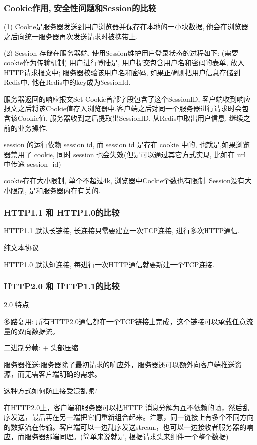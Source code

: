 \subsubsection{Cookie作用, 安全性问题和Session的比较}
(1) Cookie是服务器发送到用户浏览器并保存在本地的一小块数据,  他会在浏览器之后向统一服务器再次发送请求时被携带上.
\par
(2) Session 存储在服务器端. 使用Session维护用户登录状态的过程如下: (需要cookie作为传输机制)
用户进行登陆是, 用户提交包含用户名和密码的表单, 放入HTTP请求报文中;
服务器校验该用户名和密码, 如果正确则把用户信息存储到Redis中, 他在Redis中的key成为SessionId.
\par
服务器返回的响应报文Set-Cookie首部字段包含了这个SessionID, 客户端收到响应报文之后将该Cookie值存入浏览器中.客户端之后对同一个服务器进行请求时会包含该Cookie值, 服务器收到之后提取出SessionID, 从Redis中取出用户信息, 继续之前的业务操作.
\par
session 的运行依赖 session id, 而 session id 是存在 cookie 中的, 也就是,如果浏览器禁用了 cookie, 同时 session 也会失效(但是可以通过其它方式实现, 比如在 url 中传递 session\_id)
\par
cookie存在大小限制, 单个不超过4k, 浏览器中Cookie个数也有限制.
Session没有大小限制, 是和服务器内存有关的.
\subsubsection{HTTP1.1 和 HTTP1.0的比较}
HTTP1.1 默认长链接, 长连接只需要建立一次TCP连接, 进行多次HTTP通信.

纯文本协议


HTTP1.0 默认短连接, 每进行一次HTTP通信就要新建一个TCP连接.
\subsubsection{HTTP2.0 和 HTTP1.1的比较}
2.0 特点

多路复用: 所有HTTP2.0通信都在一个TCP链接上完成，这个链接可以承载任意流量的双向数据流。

二进制分帧: + 头部压缩

服务器推送:服务器除了最初请求的响应外，服务器还可以额外向客户端推送资源，而无需客户端明确的需求。

这种方式如何防止接受混乱呢?

在HTTP2.0上，客户端和服务器可以把HTTP 消息分解为互不依赖的帧，然后乱序发送，最后再在另一端把它们重新组合起来。注意，同一链接上有多个不同方向的数据流在传输。客户端可以一边乱序发送stream，也可以一边接收者服务器的响应，而服务器那端同理。(简单来说就是, 根据请求头来组件一个整个数据)

